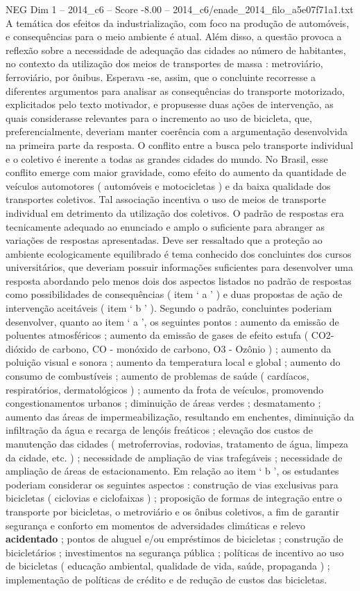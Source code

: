 \begin{textsample}{NEG Dim 1 – 2014\_c6 – Score -8.00 – 2014\_c6/enade\_2014\_filo\_a5e07f71a1.txt}
A temática dos efeitos da industrialização, com foco na produção de automóveis, e consequências para o meio ambiente é atual.
Além disso, a questão provoca a reflexão sobre a necessidade de adequação das cidades ao número de habitantes, no contexto da utilização dos meios de transportes de massa : metroviário, ferroviário, por ônibus.
Esperava -se, assim, que o concluinte recorresse a diferentes argumentos para analisar as consequências do transporte motorizado, explicitados pelo texto motivador, e propusesse duas ações de intervenção, as quais considerasse relevantes para o incremento ao uso de bicicleta, que, preferencialmente, deveriam manter coerência com a argumentação desenvolvida na primeira parte da resposta.
O conflito entre a busca pelo transporte individual e o coletivo é inerente a todas as grandes cidades do mundo.
No Brasil, esse conflito emerge com maior gravidade, como efeito do aumento da quantidade de veículos automotores ( automóveis e motocicletas ) e da baixa qualidade dos transportes coletivos.
Tal associação incentiva o uso de meios de transporte individual em detrimento da utilização dos coletivos.
O padrão de respostas era tecnicamente adequado ao enunciado e amplo o suficiente para abranger as variações de respostas apresentadas.
Deve ser ressaltado que a proteção ao ambiente ecologicamente equilibrado é tema conhecido dos concluintes dos cursos universitários, que deveriam possuir informações suficientes para desenvolver uma resposta abordando pelo menos dois dos aspectos listados no padrão de respostas como possibilidades de consequências ( item ‘ a ’ ) e duas propostas de ação de intervenção aceitáveis ( item ‘ b ’ ).
Segundo o padrão, concluintes poderiam desenvolver, quanto ao item ‘ a ’, os seguintes pontos : aumento da emissão de poluentes atmosféricos ; aumento da emissão de gases de efeito estufa ( CO2- dióxido de carbono, CO - monóxido de carbono, O3 - Ozônio ) ; aumento da poluição visual e sonora ; aumento da temperatura local e global ; aumento do consumo de combustíveis ; aumento de problemas de saúde ( cardíacos, respiratórios, dermatológicos ) ; aumento da frota de veículos, promovendo congestionamentos urbanos ; diminuição de áreas verdes ; desmatamento ; aumento das áreas de impermeabilização, resultando em enchentes, diminuição da infiltração da água e recarga de lençóis freáticos ; elevação dos custos de manutenção das cidades ( metroferrovias, rodovias, tratamento de água, limpeza da cidade, etc. ) ; necessidade de ampliação de vias trafegáveis ; necessidade de ampliação de áreas de estacionamento.
Em relação ao item ‘ b ’, os estudantes poderiam considerar os seguintes aspectos : construção de vias exclusivas para bicicletas ( ciclovias e ciclofaixas ) ; proposição de formas de integração entre o transporte por bicicletas, o metroviário e os ônibus coletivos, a fim de garantir segurança e conforto em momentos de adversidades climáticas e relevo \textbf{acidentado} ; pontos de aluguel e/ou empréstimos de bicicletas ; construção de bicicletários ; investimentos na segurança pública ; políticas de incentivo ao uso de bicicletas ( educação ambiental, qualidade de vida, saúde, propaganda ) ; implementação de políticas de crédito e de redução de custos das bicicletas.

\end{textsample}
